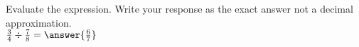 \documentclass{ximera}
\author{David Kish}
\begin{document}
\begin{exercise}
Evaluate the expression. Write your response as the exact answer not a decimal approximation.\\
$\frac{3}{4} \div \frac{7}{8}= \answer{\frac{6}{7}}$
\end{exercise}
\end{document}
